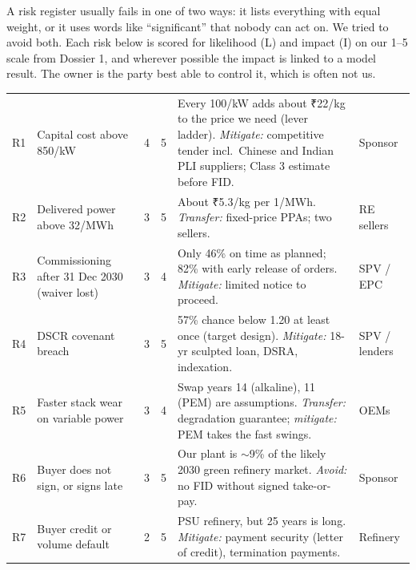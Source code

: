 \label{sec:risk}

A risk register usually fails in one of two ways: it lists everything with equal weight, or it uses words like ``significant'' that nobody can act on. We tried to avoid both. Each risk below is scored for likelihood (L) and impact (I) on our 1--5 scale from Dossier 1, and wherever possible the impact is linked to a model result. The owner is the party best able to control it, which is often not us.

\begin{center}\tablefont
\begin{xltabular}{\textwidth}{@{}c P{30mm} c c L P{17mm}@{}}
\toprule
{} &  &  &  &  & \\ \midrule
\endhead
R1 & Capital cost above \usd{}850/kW & 4 & 5 & Every \usd{}100/kW adds about ₹22/kg to the price we need (lever ladder). \emph{Mitigate:} competitive tender incl.\ Chinese and Indian PLI suppliers; Class 3 estimate before FID. & Sponsor\\
R2 & Delivered power above \usd{}32/MWh & 3 & 5 & About ₹5.3/kg per \usd{}1/MWh. \emph{Transfer:} fixed-price PPAs; two sellers. & RE sellers\\
R3 & Commissioning after 31 Dec 2030 (waiver lost) & 3 & 4 & Only 46\% on time as planned; 82\% with early release of orders. \emph{Mitigate:} limited notice to proceed. & SPV / EPC\\
R4 & DSCR covenant breach & 3 & 5 & 57\% chance below 1.20 at least once (target design). \emph{Mitigate:} 18-yr sculpted loan, DSRA, indexation. & SPV / lenders\\
R5 & Faster stack wear on variable power & 3 & 4 & Swap years 14 (alkaline), 11 (PEM) are assumptions. \emph{Transfer:} degradation guarantee; \emph{mitigate:} PEM takes the fast swings. & OEMs\\
R6 & Buyer does not sign, or signs late & 3 & 5 & Our plant is $\sim$9\% of the likely 2030 green refinery market. \emph{Avoid:} no FID without signed take-or-pay. & Sponsor\\
R7 & Buyer credit or volume default & 2 & 5 & PSU refinery, but 25 years is long. \emph{Mitigate:} payment security (letter of credit), termination payments. & Refinery\\

\end{xltabular}
\end{center}
